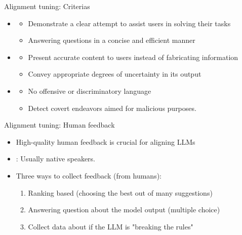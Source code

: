 \documentclass[10pt]{beamer}
\begin{document}
\begin{frame}{Alignment tuning: Criterias}


\begin{itemize}
\item {}
\begin{itemize}
\item Demonstrate a clear attempt to assist users in solving their tasks
\item Answering questions in a concise and efficient manner
\end{itemize}
\pause
\item {}
\begin{itemize}
\item Present accurate content to users instead of fabricating information
\item Convey appropriate degrees of uncertainty in its output
\end{itemize}
\pause
\item {}
\begin{itemize}
\item No offensive or discriminatory language
\item Detect covert endeavors aimed for malicious purposes.
\end{itemize}
\end{itemize}


\end{frame}



\begin{frame}{Alignment tuning: Human feedback}

\begin{itemize}
\item High-quality human feedback is crucial for aligning LLMs
\pause
\item {}: Usually native speakers.
\pause
\item Three ways to collect feedback (from humans):
\begin{enumerate}
\item Ranking based (choosing the best out of many suggestions)
\pause
\item Answering question about the model output (multiple choice)
\pause
\item Collect data about if the LLM is "breaking the rules" %
\end{enumerate}
\end{itemize}

\end{frame}
\end{document}
